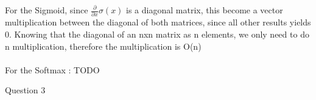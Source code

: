 \documentclass{article}
\begin{document}
\begin{enumerate}
	For the Sigmoid, since $\frac{\partial }{\partial x} \sigma(x)$ is a diagonal matrix, this become a vector multiplication between the diagonal of both matrices, since all other results yields 0.
	Knowing that the diagonal of an nxn matrix as n elements, we only need to do n multiplication, therefore the multiplication is O(n)\\ \\

	For the Softmax : TODO\\



    \vspace{0.5cm}
   
  \end{enumerate}
  
\vspace{1cm}
 Question 3 \\
\end{document}
